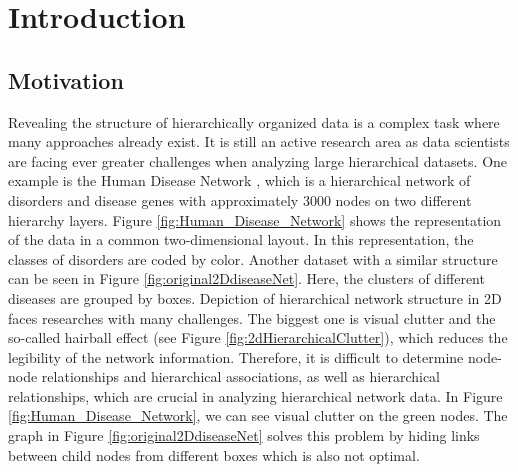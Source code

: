 \chapter{Introduction}

\section{Motivation}
\label{sec:motivation}
Revealing the structure of hierarchically organized data is a complex task where many approaches already exist. It is still an active research area as data scientists are facing ever greater challenges when analyzing large hierarchical datasets. One example is the Human Disease Network \cite{zhou_human_2014}, which is a hierarchical network of disorders and disease genes with approximately 3000 nodes on two different hierarchy layers. Figure \ref{fig:Human_Disease_Network} shows the representation of the data in a common two-dimensional layout. In this representation, the classes of disorders are coded by color. 
Another dataset with a similar structure can be seen in Figure \ref{fig:original2DdiseaseNet}. Here, the clusters of different diseases are grouped by boxes. 
Depiction of hierarchical network structure in 2D faces researches with many challenges. The biggest one is visual clutter and the so-called hairball effect (see Figure \ref{fig:2dHierarchicalClutter}), which reduces the legibility of the network information. Therefore, it is difficult to determine node-node relationships and hierarchical associations, as well as hierarchical relationships, which are crucial in analyzing hierarchical network data. In Figure \ref{fig:Human_Disease_Network}, we can see visual clutter on the green nodes. The graph in Figure \ref{fig:original2DdiseaseNet} solves this problem by hiding links between child nodes from different boxes which is also not optimal.

